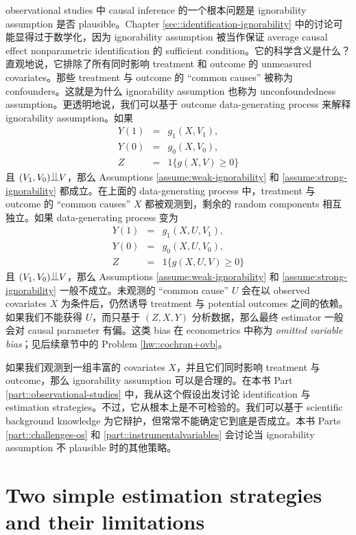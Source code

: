 observational studies 中 causal inference 的一个根本问题是 ignorability assumption 是否 plausible。Chapter \ref{sec::identification-ignorability} 中的讨论可能显得过于数学化，因为 ignorability assumption 被当作保证 average causal effect nonparametric identification 的 sufficient condition。它的科学含义是什么？直观地说，它排除了所有同时影响 treatment 和 outcome 的 unmeasured covariates。那些 treatment 与 outcome 的 ``common causes'' 被称为 confounders。这就是为什么 ignorability assumption 也称为 unconfoundedness assumption。更透明地说，我们可以基于 outcome data-generating process 来解释 ignorability assumption。如果
\begin{eqnarray*}
Y(1) &=& g_1(X, V_1),\\
Y(0) &=& g_0(X, V_0), \\
Z &=& 1\{ g(X,V)  \geq 0 \}
\end{eqnarray*} 
且 $(V_1, V_0)\ind V$，那么 Assumptions \ref{assume:weak-ignorability} 和 \ref{assume:strong-ignorability} 都成立。在上面的 data-generating process 中，treatment 与 outcome 的 ``common causes'' $X$ 都被观测到，剩余的 random components 相互独立。如果 data-generating process 变为
\begin{eqnarray*}
Y(1) &=& g_1(X, U, V_1),\\
Y(0) &=& g_0(X, U, V_0), \\
Z &=& 1\{ g(X, U, V)  \geq 0 \}
\end{eqnarray*} 
且 $(V_1, V_0)\ind V$，那么 Assumptions \ref{assume:weak-ignorability} 和 \ref{assume:strong-ignorability} 一般不成立。未观测的 ``common cause'' $U$ 会在以 observed covariates $X$ 为条件后，仍然诱导 treatment 与 potential outcomes 之间的依赖。如果我们不能获得 $U$，而只基于 $(Z,X,Y)$ 分析数据，那么最终 estimator 一般会对 causal parameter 有偏。这类 bias 在 econometrics 中称为 {\it omitted variable bias}；见后续章节中的 Problem \ref{hw::cochran+ovb}。 



如果我们观测到一组丰富的 covariates $X$，并且它们同时影响 treatment 与 outcome，那么 ignorability assumption 可以是合理的。在本书 Part \ref{part::observational-studies} 中，我从这个假设出发讨论 identification 与 estimation strategies。不过，它从根本上是不可检验的。我们可以基于 scientific background knowledge 为它辩护，但常常不能确定它到底是否成立。本书 Parts \ref{part::challenges-os} 和 \ref{part::instrumentalvariables} 会讨论当 ignorability assumption 不 plausible 时的其他策略。 




\section{Two simple estimation strategies and their limitations}


